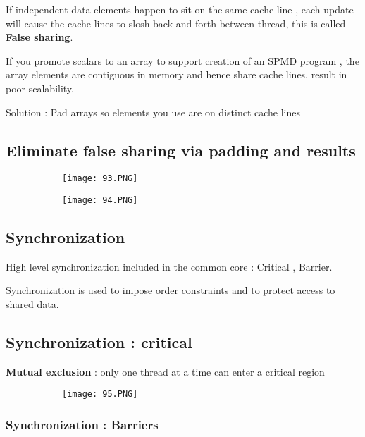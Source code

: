 \documentclass{article}
\begin{document}
If independent data elements happen to sit on the same cache line , each update will cause the cache lines to slosh back and forth between thread, this is called \textbf{False sharing}.



If you promote scalars to an array to support creation of an SPMD program , the array elements are contiguous in memory and hence share cache lines, result in poor scalability.

Solution : Pad arrays so elements you use are on distinct cache lines

\subsection{Eliminate false sharing via padding and results}

\begin{figure}[ht!]
  \centering
  \begin{subfigure}[b]{0.5\linewidth}
    \texttt{[image: 93.PNG]}
  \end{subfigure}
     \begin{subfigure}[b]{0.49\textwidth}
         \centering
         \texttt{[image: 94.PNG]}
     \end{subfigure}
\end{figure}

\subsection{Synchronization}
High level synchronization included in the common core : Critical , Barrier.

Synchronization is used to impose order constraints and to protect access to shared data.


\subsection{Synchronization : critical}

\textbf{Mutual exclusion} : only one thread at a time can enter a critical region

\begin{figure}[ht!]
  \centering
  \begin{subfigure}[b]{0.5\linewidth}
    \texttt{[image: 95.PNG]}
  \end{subfigure}
\end{figure}

\subsubsection{Synchronization : Barriers}
\end{document}
